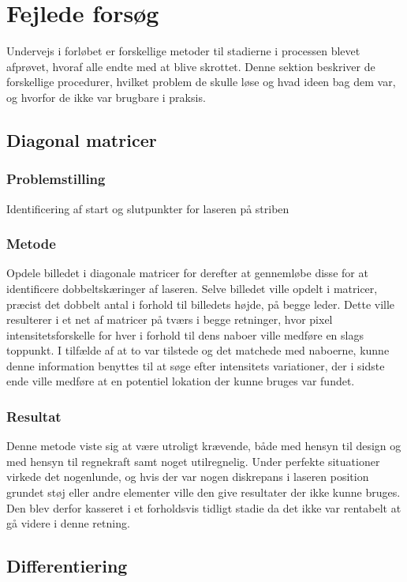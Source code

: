 \section{Fejlede forsøg}
Undervejs i forløbet er forskellige metoder til stadierne i processen blevet afprøvet, hvoraf alle endte med at blive skrottet. Denne sektion beskriver de forskellige procedurer, hvilket problem de skulle løse og hvad ideen bag dem var, og hvorfor de ikke var brugbare i praksis.

\subsection{Diagonal matricer}

\subsubsection{Problemstilling}
Identificering af start og slutpunkter for laseren på striben

\subsubsection{Metode}
Opdele billedet i diagonale matricer for derefter at gennemløbe disse for at identificere dobbeltskæringer af laseren. Selve billedet ville opdelt i matricer, præcist det dobbelt antal i forhold til billedets højde, på begge leder. Dette ville resulterer i et net af matricer på tværs i begge retninger, hvor pixel intensitetsforskelle for hver i forhold til dens naboer ville medføre en slags toppunkt. I tilfælde af at to var tilstede og det matchede med naboerne, kunne denne information benyttes til at søge efter intensitets variationer, der i sidste ende ville medføre at en potentiel lokation der kunne bruges var fundet.

\subsubsection{Resultat}
Denne metode viste sig at være utroligt krævende, både med hensyn til design og med hensyn til regnekraft samt noget utilregnelig. Under perfekte situationer virkede det nogenlunde, og hvis der var nogen diskrepans i laseren position grundet støj eller andre elementer ville den give resultater der ikke kunne bruges. Den blev derfor kasseret i et forholdsvis tidligt stadie da det ikke var rentabelt at gå videre i denne retning.

\subsection{Differentiering}

